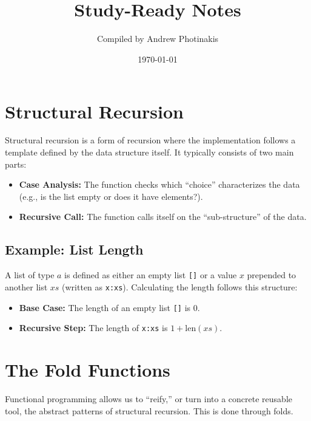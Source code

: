 \documentclass[12pt]{article}
\title{\TOPICTITLE\\\large Study-Ready Notes}
\author{Compiled by Andrew Photinakis}
\date{\today}
\begin{document}
\maketitle
\tableofcontents
\newpage




\section{Structural Recursion}

Structural recursion is a form of recursion where the implementation follows a template defined by the data structure itself. It typically consists of two main parts:

\begin{itemize}
  \item \textbf{Case Analysis:} The function checks which ``choice'' characterizes the data (e.g., is the list empty or does it have elements?).
  \item \textbf{Recursive Call:} The function calls itself on the ``sub-structure'' of the data.
\end{itemize}

\subsection{Example: List Length}

A list of type $a$ is defined as either an empty list \texttt{[]} or a value $x$ prepended to another list $xs$ (written as \texttt{x:xs}). Calculating the length follows this structure:

\begin{itemize}
  \item \textbf{Base Case:} The length of an empty list \texttt{[]} is $0$.
  \item \textbf{Recursive Step:} The length of \texttt{x:xs} is $1 + \mathrm{len}(xs)$.
\end{itemize}

\section{The Fold Functions}

Functional programming allows us to ``reify,'' or turn into a concrete reusable tool, the abstract patterns of structural recursion. This is done through folds.
\end{document}
